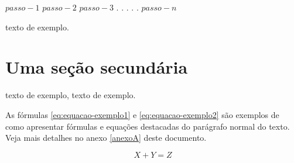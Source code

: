 \documentclass[
	12pt,				%
	oneside,			%
	a4paper,			%
	english,			%
	brazil				%
	]{abntex2ppgsi}
\begin{document}
% 
%
%
%
%
\begin{algorithm}[htbp]
\caption{Exemplo de título de ilustração do tipo algoritmo, que pode ser maior para apresentar mais explicações sobre o conteúdo do algoritmo, se for o caso}
\label{alg:algoritmo-exemplo1}
\begin{algorithmic}[1]
\State $passo-1$
\State $passo-2$
\State $passo-3$
\State $.$
\State $.$
\State $.$
\State $.$
\State $.$
\State $passo-n$
\EndProcedure
\end{algorithmic}
\end{algorithm}


 texto de exemplo.

\section{Uma seção secundária}

texto de exemplo, texto de exemplo.

As fórmulas \ref{eq:equacao-exemplo1} e \ref{eq:equacao-exemplo2} são exemplos de como apresentar fórmulas e equações destacadas do parágrafo normal do texto. Veja mais detalhes no anexo \ref{anexoA} deste documento.

\begin{equation}
  X + Y = Z
	\label{eq:equacao-exemplo1}
\end{equation}
\end{document}

